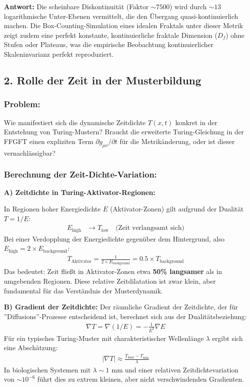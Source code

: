 	\textbf{Antwort:} Die scheinbare Diskontinuität (Faktor $\sim 7500$) wird durch $\sim 13$ logarithmische Unter-Ebenen vermittelt, die den Übergang quasi-kontinuierlich machen. Die Box-Counting-Simulation eines idealen Fraktals unter dieser Metrik zeigt zudem eine perfekt konstante, kontinuierliche fraktale Dimension ($D_f$) ohne Stufen oder Plateaus, was die empirische Beobachtung kontinuierlicher Skaleninvarianz perfekt reproduziert.
	
	\subsection*{2. Rolle der Zeit in der Musterbildung}
	
	\subsubsection*{Problem:}
	Wie manifestiert sich die dynamische Zeitdichte $T(x,t)$ konkret in der Entstehung von Turing-Mustern? Braucht die erweiterte Turing-Gleichung in der FFGFT einen expliziten Term $\partial g_{\mu\nu}/\partial t$ für die Metrikänderung, oder ist dieser vernachlässigbar?
	
	\subsubsection*{Berechnung der Zeit-Dichte-Variation:}
	
	\textbf{A) Zeitdichte in Turing-Aktivator-Regionen:}
	
	In Regionen hoher Energiedichte $E$ (Aktivator-Zonen) gilt aufgrund der Dualität $T = 1/E$:
	\begin{align*}
		E_{\text{high}} &\rightarrow T_{\text{low}} \quad \text{(Zeit verlangsamt sich)}
	\end{align*}
	Bei einer Verdopplung der Energiedichte gegenüber dem Hintergrund, also $E_{\text{high}} = 2 \times E_{\text{background}}$:
	\begin{align*}
		T_{\text{Aktivator}} = \frac{1}{2 \times E_{\text{background}}} = 0.5 \times T_{\text{background}}
	\end{align*}
	Das bedeutet: Zeit fließt in Aktivator-Zonen etwa \textbf{50\% langsamer} als in umgebenden Regionen. Diese relative Zeitdilatation ist zwar klein, aber fundamental für das Verständnis der Musterdynamik.
	
	\textbf{B) Gradient der Zeitdichte:}
	Der räumliche Gradient der Zeitdichte, der für ''Diffusions''-Prozesse entscheidend ist, berechnet sich aus der Dualitätsbeziehung:
	\begin{align*}
		\nabla T = \nabla(1/E) = -\frac{1}{E^2} \nabla E
	\end{align*}
	Für ein typisches Turing-Muster mit charakteristischer Wellenlänge $\lambda$ ergibt sich eine Abschätzung:
	\begin{align*}
		|\nabla T| \approx \frac{T_{\text{max}} - T_{\text{min}}}{\lambda}
	\end{align*}
	In biologischen Systemen mit $\lambda \sim 1$ mm und einer relativen Zeitdichtevariation von $\sim 10^{-6}$ führt dies zu extrem kleinen, aber nicht verschwindenden Gradienten.
	
